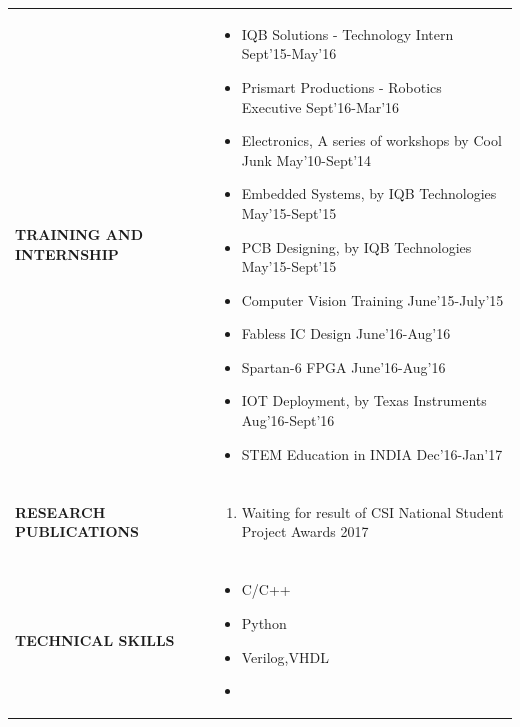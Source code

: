\documentclass[a4paper]{article}
\begin{document}
\begin{longtable}{@{}m{3.0cm}m{14cm}@{}}
			
			\textrm{\textbf{TRAINING \newline AND \newline  INTERNSHIP}} & 
				\begin{itemize}
					\itemsep -2pt
					\item
					IQB Solutions - Technology Intern \hfill  Sept'15-May'16
					\item
					Prismart Productions - Robotics Executive \hfill  Sept'16-Mar'16
					\item
					Electronics, A series of workshops by Cool Junk \hfill  May'10-Sept'14
					\item
					Embedded Systems, by IQB Technologies \hfill  May'15-Sept'15
					\item
					PCB Designing, by IQB Technologies \hfill  May'15-Sept'15
					\item
					Computer Vision Training \hfill  June'15-July'15
					\item
					Fabless IC Design \hfill  June'16-Aug'16
					\item
					Spartan-6 FPGA \hfill  June'16-Aug'16
					\item
					IOT Deployment, by Texas Instruments \hfill  Aug'16-Sept'16
					\item
					STEM Education in INDIA \hfill  Dec'16-Jan'17
				\end{itemize}
			\\ \\
			
			
			\textrm{\textbf {RESEARCH \newline PUBLICATIONS}} & 
				\begin{enumerate}
					\itemsep -2pt
					\item
					Waiting for result of CSI National Student Project Awards 2017
				\end{enumerate}
			\\ \\
			
			
			\textrm{\textbf {TECHNICAL SKILLS}} & 
				\begin{itemize}
					\itemsep -2pt
					\item
					C/C++
					\item
					Python
					\item
					Verilog,VHDL
					\item
					

\end{itemize}
\end{longtable}
\end{document}
